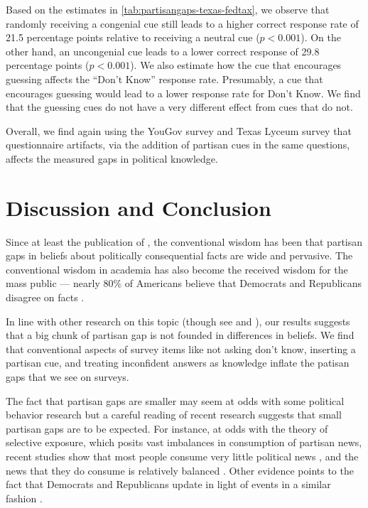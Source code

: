\documentclass[12pt, letterpaper]{article}
\begin{document}
Based on the estimates in \cref{tab:partisangaps-texas-fedtax}, we observe that randomly receiving a congenial cue still leads to a higher correct response rate of 21.5 percentage points relative to receiving a neutral cue ($p<0.001$). On the other hand, an uncongenial cue leads to a lower correct response of 29.8 percentage points ($p<0.001$).
We also estimate how the cue that encourages guessing affects the ``Don't Know'' response rate. Presumably, a cue that encourages guessing would lead to a lower response rate for Don't Know. We find that the guessing cues do not have a very different effect from cues that do not. 

Overall, we find again using the YouGov survey and Texas Lyceum survey that questionnaire artifacts, via the addition of partisan cues in the same questions, affects the measured gaps in political knowledge. 


\section*{Discussion and Conclusion}

Since at least the publication of \cite{bartels_2002}, the conventional wisdom has been that partisan gaps in beliefs about politically consequential facts are wide and pervasive. 
The conventional wisdom in academia has also become the received wisdom for the mass public --- nearly 80\% of Americans believe that Democrats and Republicans  disagree on facts \citep{pew2018disagree}.

In line with other research on this topic \citep{bullocketal_2015, prior2015you, schaffner_luks} (though see \cite{berinsky_2017} and \cite{peterson_iyengar_forth}), our results suggests that a big chunk of partisan gap is not founded in differences in beliefs. We find that conventional aspects of survey items like not asking don't know, inserting a partisan cue, and treating inconfident answers as knowledge inflate the patisan gaps that we see on surveys. 

The fact that partisan gaps are smaller may seem at odds with some political behavior research but a careful reading of recent research suggests that small partisan gaps are to be expected. For instance, at odds with the theory of selective exposure, which posits vast imbalances in consumption of partisan news, recent studies show that most people consume very little political news \citep{Prior2007,flaxmanetal_2016}, and the news that they do consume is relatively balanced \citep{flaxmanetal_2016,garzetal_2018,gentzkowshapiro_2011,guess_2020}. Other evidence points to the fact that Democrats and Republicans update in light of events in a similar fashion \citep{gerber_annual_review,kernell_2019}.
\end{document}
